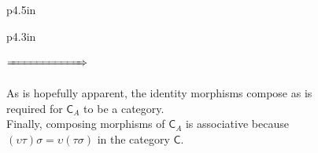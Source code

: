 \documentclass{book}
\newenvironment{myIndent}{%
   \begin{adjustwidth}{2.5em}{0em}%
}{%
   \end{adjustwidth}%
}
\newenvironment{myDindent}{%
   \begin{adjustwidth}{5em}{0em}%
}{%
   \end{adjustwidth}%
}
\newcommand{\mcateg}[1]{\mathsf{#1}}
\newcommand{\retTwo}{\hfill\bigbreak}
\begin{document}
\begin{myIndent}
\begin{itemize}
{\begin{myDindent}
\begin{tabular}{p{4.5in}}
\begin{tabular}{p{4.3in}}
                  {
                  $\xRightarrow{\phantom{aaaaaaaaaaaaaaa}}$
                  }\retTwo
                  
                  As is hopefully apparent, the identity morphisms compose as is\\ required for $\mcateg{C}_A$ to be a category.\\ [6pt]

                  Finally, composing morphisms of $\mcateg{C}_A$ is associative because\\ $(\upsilon\tau)\sigma = \upsilon(\tau\sigma)$ in the category $\mcateg{C}$.
                  

\end{tabular}
\end{tabular}
\end{myDindent}}
\end{itemize}
\end{myIndent}
\end{document}
